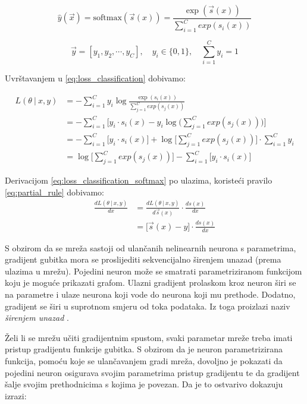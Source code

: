 \documentclass[times, utf8, numeric, diplomski]{fer}
\def\dfrac#1#2{\frac{d #1}{d #2}}
\def\probsep{\ |\ }
\begin{document}
\begin{equation}
\label{eq:softmax_for_loss}
\hat{y}(\vec{x}) = \text{softmax}(\vec{s}(x)) = \frac{\exp(\vec{s}(x))}{\sum_{i=1}^{C} exp(s_i(x))}
\end{equation}

\begin{equation}
\label{eq:onehot}
\vec{y}=[y_1, y_2, \cdots, y_C], \quad y_i \in \{0,1\}, \quad \sum_{i=1}^C y_i = 1
\end{equation}

Uvrštavanjem u \eqref{eq:loss_classification} dobivamo:

\begin{align}
\label{eq:loss_classification_softmax}
L(\theta \probsep x,y) &= - \sum_{i=1}^C y_i \log \frac{\exp(s_i(x))}{\sum_{j=1}^{C} exp(s_j(x))} \nonumber \\
&= - \sum_{i=1}^C \bigg[ y_i \cdot s_i(x) - y_i \log\big(\sum_{j=1}^{C} exp(s_j(x))\big) \bigg] \nonumber \\
&= - \sum_{i=1}^C \big[ y_i \cdot s_i(x) \big] + \log\big[\sum_{j=1}^{C} exp(s_j(x))\big] \cdot \sum_{i=1}^C y_i \nonumber \\
&= \log\big[\sum_{j=1}^{C} exp(s_j(x))\big] - \sum_{i=1}^C \big[ y_i \cdot s_i(x) \big]
\end{align}

Derivacijom \eqref{eq:loss_classification_softmax} po ulazima, koristeći pravilo \eqref{eq:partial_rule} dobivamo:
\begin{align}
\label{eq:loss_classification_softmax_deriv}
\dfrac{L(\theta \probsep x,y)}{x} &= \dfrac{L(\theta \probsep x,y)}{\vec{s}(x)} \cdot \dfrac{s(x)}{x} \nonumber \\
&= \bigg[ \vec{s}(x) - y \bigg] \cdot \dfrac{s(x)}{x}
\end{align}

S obzirom da se mreža sastoji od ulančanih nelinearnih neurona s parametrima, gradijent gubitka mora se proslijediti sekvencijalno širenjem unazad (prema ulazima u mrežu). Pojedini neuron može se smatrati parametriziranom funkcijom koju je moguće prikazati grafom. Ulazni gradijent prolaskom kroz neuron širi se na parametre i ulaze neurona koji vode do neurona koji mu prethode. Dodatno, gradijent se širi u suprotnom smjeru od toka podataka. Iz toga proizlazi naziv \textit{širenjem unazad} .

Želi li se mrežu učiti gradijentnim spustom, svaki parametar mreže treba imati pristup gradijentu funkcije gubitka. S obzirom da je neuron parametrizirana funkcija, pomoću koje se ulančavanjem gradi mreža, dovoljno je pokazati da pojedini neuron osigurava svojim parametrima pristup gradijentu te da gradijent šalje svojim prethodnicima s kojima je povezan. Da je to ostvarivo dokazuju izrazi:
\end{document}
